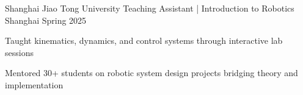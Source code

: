 
\vspace{-8mm}

\begin{cventries}
    \cventry
    {Shanghai Jiao Tong University} %
    {Teaching Assistant | Introduction to Robotics} %
    {Shanghai} %
    {Spring 2025} %
    {
        \vspace{-5mm}
        \begin{cvitems}
            \item{Taught kinematics, dynamics, and control systems through interactive lab sessions}
            \item{Mentored 30+ students on robotic system design projects bridging theory and implementation}
        \end{cvitems}
        \vspace{1mm}
    }
\end{cventries}
